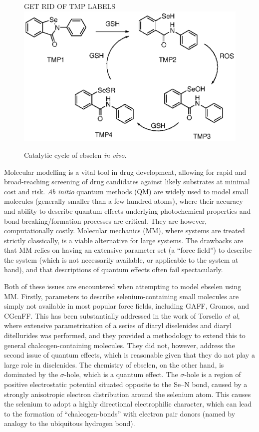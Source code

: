 \begin{refsection}
\begin{figure}
\centering
GET RID OF TMP LABELS
\includegraphics[scale=0.74]{Figures/ebs-cat-cycle.eps}
\caption{Catalytic cycle of ebselen  \emph{in vivo}.}
\label{fig:catcycle}
\end{figure}

Molecular modelling is a vital tool in drug development, allowing for rapid and broad-reaching screening of drug candidates against likely substrates at minimal cost and risk.
\emph{Ab initio} quantum methods (QM) are widely used to model small molecules (generally smaller than a few hundred atoms), where their accuracy and ability to describe quantum effects underlying photochemical properties and bond breaking/formation processes are critical.
They are however, computationally costly.
Molecular mechanics (MM), where systems are treated strictly classically, is a viable alternative for large systems.
The drawbacks are that MM relies on having an extensive parameter set (a ``force field'') to describe the system (which is not necessarily available, or applicable to the system at hand), and that descriptions of quantum effects often fail spectacularly.

Both of these issues are encountered when attempting to model ebselen using MM.
Firstly, parameters to describe selenium-containing small molecules are simply not available in most popular force fields, including GAFF, Gromos, and CGenFF.
This has been substantially addressed in the work of Torsello \emph{et al}, where extensive parametrization of a series of diaryl diselenides and diaryl ditellurides was performed, and they provided a methodology to extend this to general chalcogen-containing molecules.\autocite{Torsello2016}
They did not, however, address the second issue of quantum effects, which is reasonable given that they do not play a large role in diselenides.
The chemistry of ebselen, on the other hand, is dominated by the $\sigma$-hole, which is a quantum effect.\autocite{Thomas2015}
The $\sigma$-hole is a region of positive electrostatic potential situated opposite to the Se--N bond, caused by a strongly anisotropic electron distribution around the selenium atom.
This causes the selenium to adopt a highly directional electrophilic character, which can lead to the formation of ``chalcogen-bonds'' with electron pair donors (named by analogy to the ubiquitous hydrogen bond).\autocite{Murray2009}


\end{refsection}
